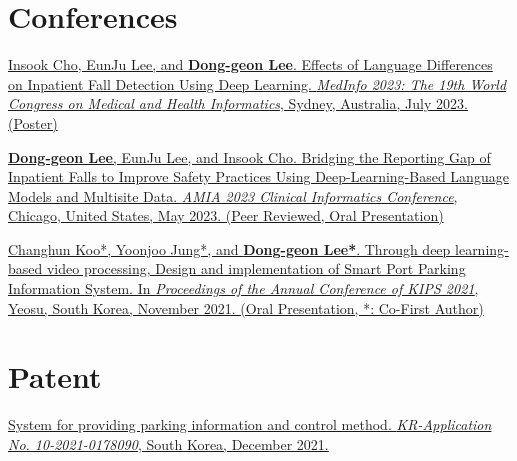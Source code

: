 \documentclass[letterpaper,11pt]{article}
\begin{document}
    \section{Conferences}
    \begin{enumerate}[noitemsep, leftmargin=*,label={[\arabic*]}]
        \item \href{https://bit.ly/medinfo2023poster}{Insook Cho, EunJu Lee, and \textbf{Dong-geon Lee}. Effects of Language Differences on Inpatient Fall Detection Using Deep Learning. \textit{MedInfo 2023: The 19th World Congress on Medical and Health Informatics}, Sydney, Australia, July 2023. (Poster)}
        
        \item \href{https://bit.ly/cic23abstract}{\textbf{Dong-geon Lee}, EunJu Lee, and Insook Cho. Bridging the Reporting Gap of Inpatient Falls to Improve Safety Practices Using Deep-Learning-Based Language Models and Multisite Data. \textit{AMIA 2023 Clinical Informatics Conference}, Chicago, United States, May 2023. (Peer Reviewed, Oral Presentation)}
        
        \item {\href{https://doi.org/10.3745/PKIPS.y2021m11a.1342}{Changhun Koo*, Yoonjoo Jung*, and \textbf{Dong-geon Lee*}. Through deep learning-based video processing, Design and implementation of Smart Port Parking Information System. In \textit{Proceedings of the Annual Conference of KIPS 2021}, Yeosu, South Korea, November 2021. (Oral Presentation, *: Co-First Author)}}
    \end{enumerate}

    \section{Patent}
    \begin{enumerate}[noitemsep, leftmargin=*,label={[\arabic*]}]
        \item{\href{https://doi.org/10.8080/1020210178090}{System for providing parking information and control method. \textit{KR-Application No. 10-2021-0178090}, South Korea, December 2021.}}
    \end{enumerate}
    
\end{document}
